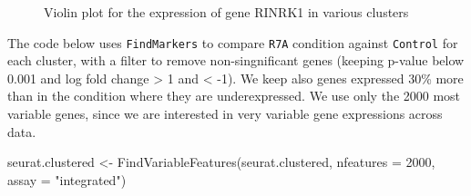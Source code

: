 \documentclass[
  letterpaper,
  DIV=11,
  numbers=noendperiod]{scrartcl}
\newenvironment{Shaded}{\begin{snugshade}}{\end{snugshade}}
\newcommand{\AttributeTok}[1]{\textcolor[rgb]{0.40,0.45,0.13}{#1}}
\newcommand{\DecValTok}[1]{\textcolor[rgb]{0.68,0.00,0.00}{#1}}
\newcommand{\FunctionTok}[1]{\textcolor[rgb]{0.28,0.35,0.67}{#1}}
\newcommand{\NormalTok}[1]{\textcolor[rgb]{0.00,0.23,0.31}{#1}}
\newcommand{\OtherTok}[1]{\textcolor[rgb]{0.00,0.23,0.31}{#1}}
\newcommand{\StringTok}[1]{\textcolor[rgb]{0.13,0.47,0.30}{#1}}
\begin{document}
\begin{figure}[H]


\caption{\label{fig-vln}Violin plot for the expression of gene RINRK1 in
various clusters}

\end{figure}%

The code below uses \texttt{FindMarkers} to compare \texttt{R7A}
condition against \texttt{Control} for each cluster, with a filter to
remove non-singnificant genes (keeping p-value below 0.001 and log fold
change \textgreater{} 1 and \textless{} -1). We keep also genes
expressed 30\% more than in the condition where they are underexpressed.
We use only the 2000 most variable genes, since we are interested in
very variable gene expressions across data.

\begin{Shaded}
\begin{Highlighting}[]
\NormalTok{seurat.clustered }\OtherTok{\textless{}{-}} \FunctionTok{FindVariableFeatures}\NormalTok{(seurat.clustered, }\AttributeTok{nfeatures =} \DecValTok{2000}\NormalTok{, }\AttributeTok{assay =} \StringTok{"integrated"}\NormalTok{)}
\end{Highlighting}
\end{Shaded}
\end{document}
